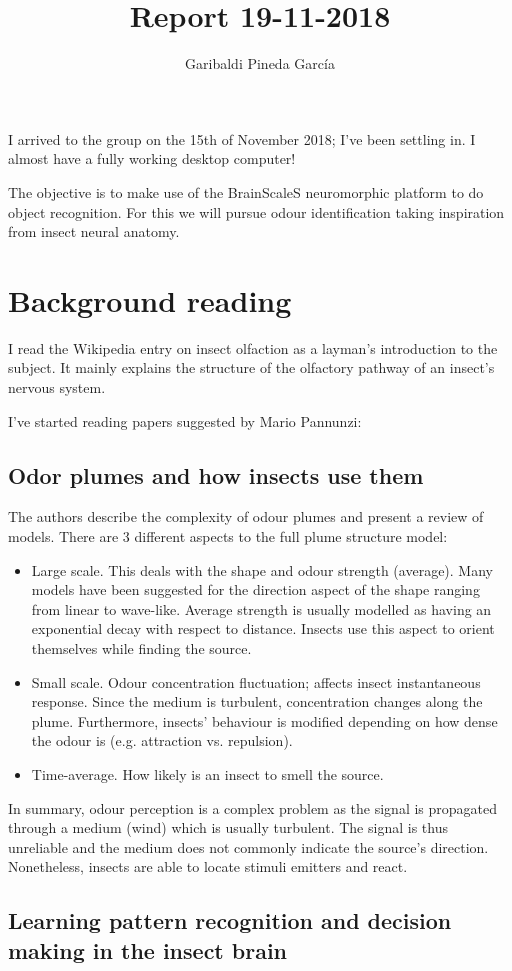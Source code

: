 \documentclass[11pt,a4paper]{article}
\author{Garibaldi Pineda Garc{\'i}a}
\title{Report 19-11-2018}
\begin{document}
  \maketitle
  I arrived to the group on the 15th of November 2018; I've been settling in. 
  I almost have a fully working desktop computer!
  
  The objective is to make use of the BrainScaleS neuromorphic platform to do object recognition. 
  For this we will pursue odour identification taking inspiration from insect neural anatomy. 
  
  \section{Background reading}
  I read the Wikipedia entry on insect olfaction as a layman's introduction to the subject. 
  It mainly explains the structure of the olfactory pathway of an insect's nervous system. 
  
  I've started reading papers suggested by Mario Pannunzi:
    \subsection{Odor plumes and how insects use them}
    The authors describe the complexity of odour plumes and present a review of models. 
    There are 3 different aspects to the full plume structure model:
    \begin{itemize}
      \item Large scale. 
      This deals with the shape and odour strength (average). 
      Many models have been suggested for the direction aspect of the shape ranging from linear to wave-like. 
      Average strength is usually modelled as having an exponential decay with respect to distance.
      Insects use this aspect to orient themselves while finding the source. 
      
      \item Small scale. Odour concentration fluctuation; affects insect instantaneous response.
      Since the medium is turbulent, concentration changes along the plume. 
      Furthermore, insects' behaviour is modified depending on how dense the odour is (e.g. attraction vs. repulsion). 
      
      \item Time-average. How likely is an insect to smell the source.
      
    \end{itemize}
    In summary, odour perception is a complex problem as the signal is propagated through a medium (wind) which is usually turbulent. 
    The signal is thus unreliable and the medium does not commonly indicate the source's direction.
    Nonetheless, insects are able to locate stimuli emitters and react.
   \subsection{Learning pattern recognition and decision making in the insect brain}
   
\end{document}
